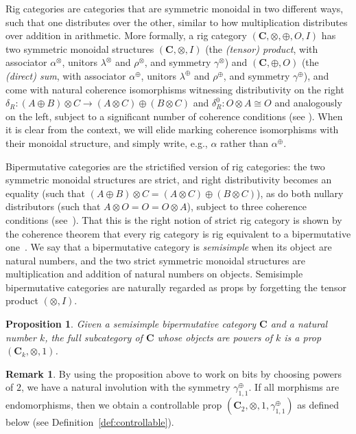 \documentclass[a4paper]{article}
\theoremstyle{plain}
\newtheorem{proposition}[theorem]{Proposition}
\theoremstyle{definition}
\newtheorem{remark}[theorem]{Remark}
\newcommand{\cat}[1]{\mathbf{#1}}
\newcommand{\symtimes}{\gamma^\otimes}
\newcommand{\symplus}{\gamma^\oplus}
\begin{document}
Rig categories are categories that are symmetric monoidal in two
different ways, such that one distributes over the other, similar to
how multiplication distributes over addition in arithmetic. More
formally, a rig category $(\cat{C},\otimes,\oplus,O,I)$ has two
symmetric monoidal structures $(\cat{C},\otimes,I)$ (the
\emph{(tensor) product}, with associator $\alpha^\otimes$, unitors
$\lambda^\otimes$ and $\rho^\otimes$, and symmetry $\symtimes$)
and $(\cat{C},\oplus,O)$ (the \emph{(direct) sum}, with associator
$\alpha^\oplus$, unitors $\lambda^\oplus$ and $\rho^\oplus$, and
symmetry $\symplus$), and come with natural coherence
isomorphisms witnessing distributivity on the right $\delta_R : (A
\oplus B) \otimes C \to (A \otimes C) \oplus (B \otimes C)$ and
$\delta^0_R : O \otimes A \cong O$ and analogously on the left,
subject to a significant number of coherence conditions (see
\cite{bimonoidal-book}). When it is clear from the context, we will
elide marking coherence isomorphisms with their monoidal structure,
and simply write, e.g., $\alpha$ rather than $\alpha^\oplus$.

Bipermutative categories are the strictified version of rig categories: the two
symmetric monoidal structures are strict, and right distributivity becomes an
equality (such that $(A \oplus B) \otimes C = (A \otimes C) \oplus (B \otimes
C)$), as do both nullary distributors (such that $A \otimes O = O = O \otimes
A$), subject to three coherence conditions (see~\cite{may,bimonoidal-book}).
That this is the right notion of strict rig category is shown by the coherence
theorem that every rig category is rig equivalent to a bipermutative
one~\cite[Prop. 3.5]{may}. We say that a bipermutative category is
\emph{semisimple} when its object are natural numbers, and the two strict
symmetric monoidal structures are multiplication and addition of natural
numbers on objects. Semisimple bipermutative categories are naturally regarded
as props by forgetting the tensor product $(\otimes,I)$.

\begin{proposition}
	\label{prop:powers}
	Given a semisimple bipermutative category $\cat C$ and a natural number
	$k$, the full subcategory of $\cat C$ whose objects are powers of $k$ is a
	prop $(\cat C_k, \otimes, 1)$.
\end{proposition}

\begin{remark}
	By using the proposition above to work on bits by choosing powers of $2$,
	we have a natural involution with the symmetry $\symplus_{1,1}$. If all
	morphisms are endomorphisms, then we obtain a controllable prop $(\cat C_2,
	\otimes, 1, \symplus_{1,1})$ as defined below (see
	Definition~\ref{def:controllable}).
\end{remark}
\end{document}
